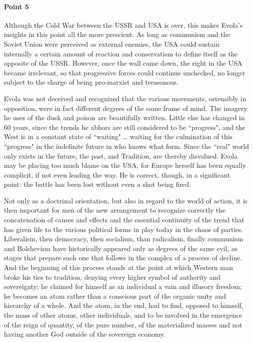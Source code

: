 \paragraph{Point 5}
\begin{quotex}
Although the Cold War between the USSR and USA is over, this makes Evola's insights in this point all the more prescient. As long as communism and the Soviet Union were perceived as external enemies, the USA could sustain internally a certain amount of reaction and conservatism to define itself as the opposite of the USSR. However, once the wall came down, the right in the USA became irrelevant, so that progressive forces could continue unchecked, no longer subject to the charge of being pro-marxist and treasonous.

Evola was not deceived and recognized that the various movements, ostensibly in opposition, were in fact different degrees of the same frame of mind. The imagery he uses of the dusk and poison are beautifully written. Little else has changed in 60 years, since the trends he abhors are still considered to be ``progress", and the West is in a constant state of ``waiting" … waiting for the culmination of this ``progress" in the indefinite future in who knows what form. Since the ``real" world only exists in the future, the past, and Tradition, are thereby disvalued. Evola may be placing too much blame on the USA, for Europe herself has been equally complicit, if not even leading the way. He is correct, though, in a significant point: the battle has been lost without even a shot being fired. 

\end{quotex}
Not only as a doctrinal orientation, but also in regard to the world of action, it is then important for men of the new arrangement to recognize correctly the concatenation of causes and effects and the essential continuity of the trend that has given life to the various political forms in play today in the chaos of parties. Liberalism, then democracy, then socialism, than radicalism, finally communism and Bolshevism have historically appeared only as degrees of the same evil, as stages that prepare each one that follows in the complex of a process of decline. And the beginning of this process stands at the point at which Western man broke his ties to tradition, denying every higher symbol of authority and sovereignty; he claimed for himself as an individual a vain and illusory freedom; he becomes an atom rather than a conscious part of the organic unity and hierarchy of a whole. And the atom, in the end, had to find, opposed to himself, the mass of other atoms, other individuals, and to be involved in the emergence of the reign of quantity, of the pure number, of the materialized masses and not having another God outside of the sovereign economy.

